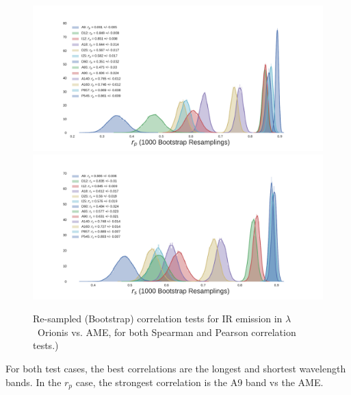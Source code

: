                     \begin{figure}
                      \includegraphics[width=\textwidth]{../Plots/ch_lori/bootstrap_vs_AME_pearson_i1000.pdf}
                      \includegraphics[width=\textwidth]{../Plots/ch_lori/bootstrap_vs_AME_spearman_i1000.pdf}
                      \centering
                      \caption{Re-sampled (Bootstrap) correlation tests for IR emission in $\lambda$~Orionis vs. AME, for both Spearman and Pearson correlation tests.) }
                      \label{fig:bootstrap_vs_AME}
                    \end{figure}
                For both test cases, the best correlations are the longest and shortest wavelength bands. In the $r_{p}$ case, the strongest correlation is the A9 band vs the AME.
